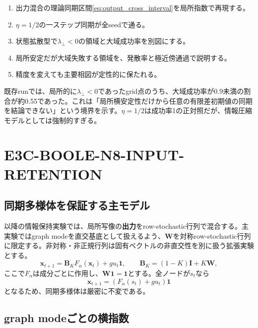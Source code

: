 \documentclass[a4paper,11pt,oneside,openany]{ltjsbook}
\newcommand{\ones}{\bm{1}}
\newcommand{\vect}[1]{\bm{#1}}
\newcommand{\mat}[1]{\bm{#1}}
\begin{document}
\begin{gatebox}
\begin{enumerate}
  \item 出力混合の理論同期区間\cref{eq:output_cross_interval}を局所指数で再現する。
  \item \(\eta=1/2\)の一ステップ同期が全seedで通る。
  \item 状態拡散型で\(\lambda_\perp<0\)の領域と大域成功率を別図にする。
  \item 局所安定だが大域失敗する領域を、発散率と極近傍通過で説明する。
  \item 精度を変えても主要相図が定性的に保たれる。
\end{enumerate}
\end{gatebox}

\begin{reportbox}
既存runでは、局所的に\(\lambda_\perp<0\)であったgrid点のうち、大域成功率が0.9未満の割合が約0.55であった。これは「局所横安定性だけから任意の有限差初期値の同期を結論できない」という境界を示す。\(\eta=1/2\)は成功率1の正対照だが、情報圧縮モデルとしては強制的すぎる。
\end{reportbox}

\section{E3C-BOOLE-N8-INPUT-RETENTION}

\subsection{同期多様体を保証する主モデル}

以降の情報保持実験では、局所写像の\textbf{出力}をrow-stochastic行列で混合する。主実験ではgraph modeを直交基底として扱えるよう、\(\mat W\)を対称row-stochastic行列に限定する。非対称・非正規行列は固有ベクトルの非直交性を別に扱う拡張実験とする。
\begin{equation}
  \vect x_{t+1}
  =\mat B_K F_\alpha(\vect x_t)
   +g u_t\ones,
  \qquad
  \mat B_K=(1-K)\mat I+K\mat W,
  \label{eq:output_mixing_network}
\end{equation}
ここで\(F_\alpha\)は成分ごとに作用し、\(\mat W\ones=\ones\)とする。全ノードが\(s_t\)なら
\begin{equation}
  \vect x_{t+1}
  =\left(F_\alpha(s_t)+gu_t\right)\ones
\end{equation}
となるため、同期多様体は厳密に不変である。

\subsection{graph modeごとの横指数}
\end{document}
